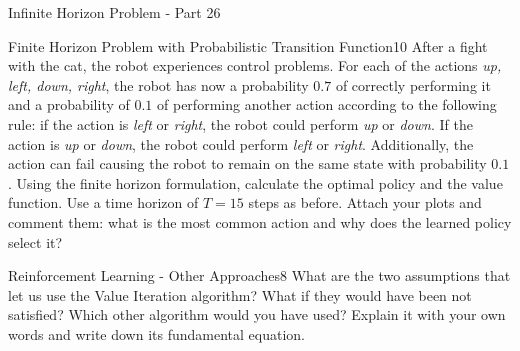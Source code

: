 \begin{questions}
\begin{question}{Infinite Horizon Problem - Part 2}{6}
\begin{answer}\end{answer}

\end{question}



\begin{question}{Finite Horizon Problem with Probabilistic Transition Function}{10}
After a fight with the cat, the robot experiences control problems. 
For each of the actions \textit{up, left, down, right}, the robot has now a probability $0.7$ of correctly performing it and a probability of $0.1$ of performing another action according to the following rule: if the action is \textit{left} or \textit{right}, the robot could perform \textit{up} or \textit{down}. If the action is \textit{up} or \textit{down}, the robot could perform \textit{left} or \textit{right}.
Additionally, the action can fail causing the robot to remain on the same state with probability $0.1$.
Using the finite horizon formulation, calculate the optimal policy and the value function. Use a time horizon of $T=15$ steps as before. Attach your plots and comment them: what is the most common action and why does the learned policy select it?

\begin{answer}\end{answer}

\end{question}



\begin{question}[bonus]{Reinforcement Learning - Other Approaches}{8}
What are the two assumptions that let us use the Value Iteration algorithm? What if they would have been not satisfied? Which other algorithm would you have used? Explain it with your own words and write down its fundamental equation.

\begin{answer}\end{answer}
\end{question}


\end{questions}
